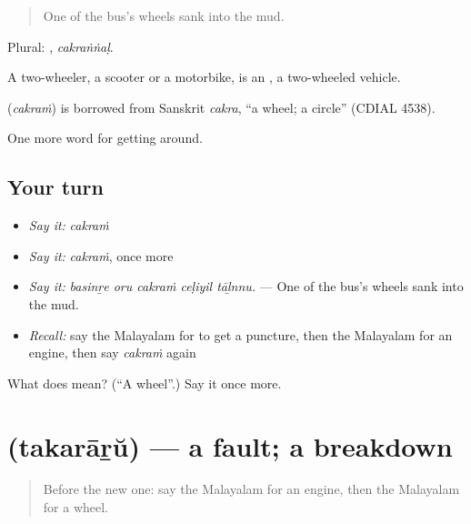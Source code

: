 \begin{quote}
One of the bus's wheels sank into the mud.
\end{quote}

Plural: , \emph{cakraṅṅaḷ}.

A two-wheeler, a scooter or a motorbike, is an , a two-wheeled vehicle.

\begin{cousinweb}
\textbf{} (\emph{cakraṁ}) is borrowed from Sanskrit \emph{cakra}, \textquotedblleft{}a wheel; a circle\textquotedblright{} (CDIAL 4538).
\end{cousinweb}

\begin{grammarlens}[title={What you've built}]
One more word for getting around.
\end{grammarlens}

\subsection*{Your turn}
\begin{itemize}
\raggedright
  \item \emph{Say it:} \emph{cakraṁ}
  \item \emph{Say it:} \emph{cakraṁ}, once more
  \item \emph{Say it:} \emph{basinṟe oru cakraṁ ceḷiyil tāḻnnu.} — One of the bus's wheels sank into the mud.
  \item \emph{Recall:} say the Malayalam for to get a puncture, then the Malayalam for an engine, then say \emph{cakraṁ} again
\end{itemize}

\begin{tcolorbox}[breakable,colback=teal!4,colframe=teal!35!black,title={Before you move on}]
What does  mean? (\textquotedblleft{}A wheel\textquotedblright{}.) Say it once more.
\end{tcolorbox}
\section[\texorpdfstring{\ml{തകരാറ്} (takarāṟŭ)}{തകരാറ് (takarāṟŭ)}]{ (takarāṟŭ) — a fault; a breakdown}

\label{lesson:ML-C471-takararu}



\begin{quote}
Before the new one: say the Malayalam for an engine, then the Malayalam for a wheel.
\end{quote}

